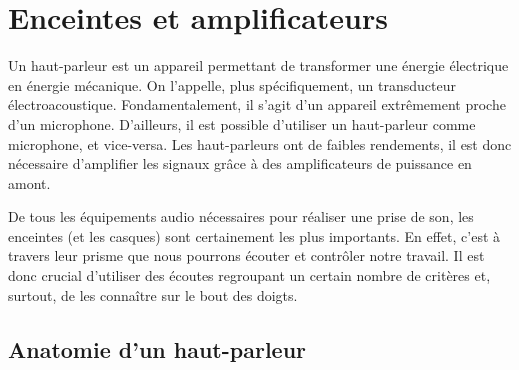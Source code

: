 \documentclass[
  letterpaper,
  DIV=11,
  numbers=noendperiod]{scrreprt}
\begin{document}
\hypertarget{enceintes-et-amplificateurs}{%
\chapter{Enceintes et
amplificateurs}\label{enceintes-et-amplificateurs}}

Un haut-parleur est un appareil permettant de transformer une énergie
électrique en énergie mécanique. On l'appelle, plus spécifiquement, un
transducteur électroacoustique. Fondamentalement, il s'agit d'un
appareil extrêmement proche d'un microphone. D'ailleurs, il est possible
d'utiliser un haut-parleur comme microphone, et vice-versa. Les
haut-parleurs ont de faibles rendements, il est donc nécessaire
d'amplifier les signaux grâce à des amplificateurs de puissance en
amont.

De tous les équipements audio nécessaires pour réaliser une prise de
son, les enceintes (et les casques) sont certainement les plus
importants. En effet, c'est à travers leur prisme que nous pourrons
écouter et contrôler notre travail. Il est donc crucial d'utiliser des
écoutes regroupant un certain nombre de critères et, surtout, de les
connaître sur le bout des doigts.

\hypertarget{anatomie-dun-haut-parleur}{%
\section{Anatomie d'un haut-parleur}\label{anatomie-dun-haut-parleur}}
\end{document}
